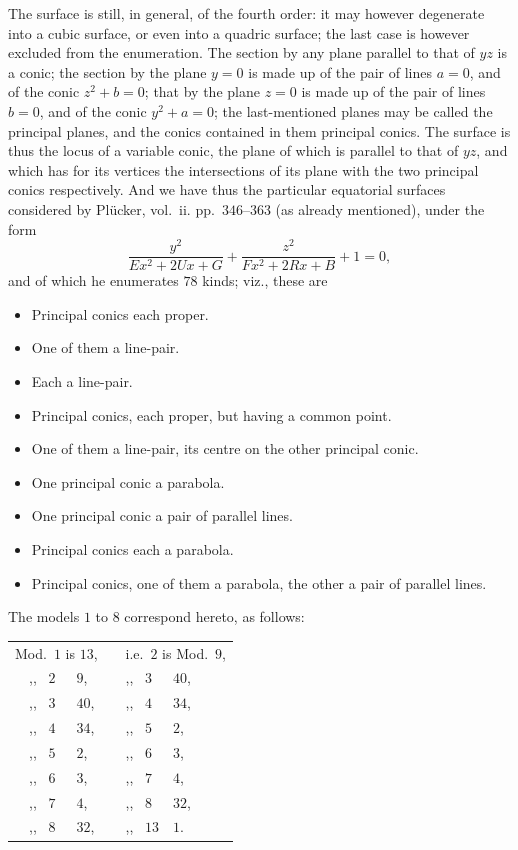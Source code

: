 \documentclass[11pt,a4paper]{article}
\begin{document}
The surface is still, in general, of the fourth order: it may however
degenerate into a cubic surface, or even into a quadric surface; the last
case is however excluded from the enumeration. The section by any plane
parallel to that of $yz$ is a conic; the section by the plane $y = 0$ is
made up of the pair of lines $a = 0$, and of the conic $z^2 + b = 0$;
that by the plane $z = 0$ is made up of the pair of lines $b = 0$, and
of the conic $y^2 + a = 0$; the last-mentioned planes may be called the
principal planes, and the conics contained in them principal conics. The
surface is thus the locus of a variable conic, the plane of which is
parallel to that of $yz$, and which has for its vertices the
intersections of its plane with the two principal conics respectively.
And we have thus the particular equatorial surfaces considered by
Pl\"ucker, vol.~ii. pp.~$346$--$363$ (as already mentioned), under the form
\[
\frac{y^2}{Ex^2 + 2Ux + G} + \frac{z^2}{Fx^2 + 2Rx + B} + 1 = 0,
\]
and of which he enumerates $78$ kinds; viz., these are
\begin{itemize}[leftmargin=2em,topsep=2pt,itemsep=0pt]
\item[$1$ to $17$] Principal conics each proper.
\item[$18$ ,, $29$] One of them a line-pair.
\item[$30$ ,, $32$] Each a line-pair.
\item[$33$ ,, $39$] Principal conics, each proper, but having a common point.
\item[$40$ ,, $43$] One of them a line-pair, its centre on the other principal conic.
\item[$44$ ,, $61$] One principal conic a parabola.
\item[$62$ ,, $73$] One principal conic a pair of parallel lines.
\item[$74$ ,, $76$] Principal conics each a parabola.
\item[$77$ and $78$] Principal conics, one of them a parabola, the other a pair of parallel lines.
\end{itemize}

\medskip

The models $1$ to $8$ correspond hereto, as follows:
\begin{center}
\begin{tabular}{lcl}
Mod.\ $1$ is $13$, & \quad & i.e.\ $2$ is Mod.\ $9$, \\
\ \ ,, \ $2$\ \ \ $9$,   & & ,, \ $3$\ \ \ $40$, \\
\ \ ,, \ $3$\ \ \ $40$,  & & ,, \ $4$\ \ \ $34$, \\
\ \ ,, \ $4$\ \ \ $34$,  & & ,, \ $5$\ \ \ $2$, \\
\ \ ,, \ $5$\ \ \ $2$,   & & ,, \ $6$\ \ \ $3$, \\
\ \ ,, \ $6$\ \ \ $3$,   & & ,, \ $7$\ \ \ $4$, \\
\ \ ,, \ $7$\ \ \ $4$,   & & ,, \ $8$\ \ \ $32$, \\
\ \ ,, \ $8$\ \ \ $32$,  & & ,, \ $13$\ \ $1$.
\end{tabular}
\end{center}
\end{document}
